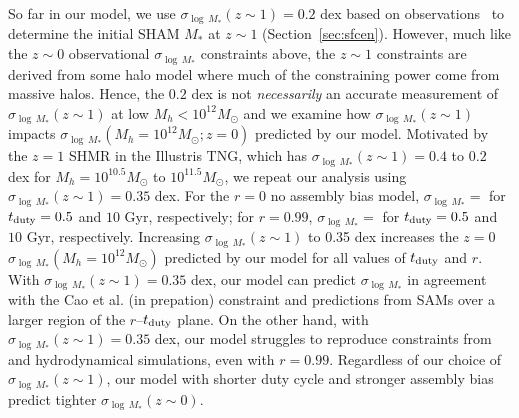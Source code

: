 \documentclass[12pt, letterpaper, preprint, tighten]{aastex62}
\begin{document}
So far in our model, we use $\sigma_{\log\,M_*}(z\sim1) = 0.2$ dex based on observations~\citep[\emph{e.g.}][]{leauthaud2012, tinker2013, patel2015}
to determine the initial SHAM $M_*$ at $z\sim1$ (Section~\ref{sec:sfcen}).
However, much like the $z\sim0$ observational $\sigma_{\log\,M_*}$ constraints 
above, the $z\sim1$ constraints are derived from some halo model where much of 
the constraining power come from massive halos. Hence, the $0.2$ dex is not 
{\em necessarily} an accurate measurement of $\sigma_{\log\,M_*}(z\sim1)$ at low 
$M_h < 10^{12}M_\odot$ and we examine how $\sigma_{\log\,M_*}(z\sim1)$ impacts 
$\sigma_{\log\,M_*}(M_h=10^{12}M_\odot; z=0)$ predicted by our model. Motivated by 
the $z=1$ SHMR in the Illustris TNG, which has $\sigma_{\log\,M_*}(z\sim1) = 0.4$ 
to $0.2$ dex for $M_h = 10^{10.5}M_\odot$ to $10^{11.5}M_\odot$, we repeat our 
analysis using $\sigma_{\log\,M_*}(z\sim1) = 0.35$ dex. For the $r=0$ no assembly bias model, 
$\sigma_{\log\,M_*} = $ for $t_{\rm duty} = 0.5$ and $10$ Gyr, respectively;
for $r = 0.99$, 
$\sigma_{\log\,M_*} = $ for $t_{\rm duty} = 0.5$ and $10$ Gyr, respectively.
Increasing $\sigma_{\log\,M_*}(z\sim1)$ to 0.35 dex increases the $z=0$ 
$\sigma_{\log\,M_*}(M_h=10^{12}M_\odot)$ predicted by our model for all values of 
$t_{\rm duty}$ and $r$. With $\sigma_{\log\,M_*}(z\sim1) = 0.35$ dex, our model 
can predict $\sigma_{\log\,M_*}$ in agreement with the Cao et al. (in prepation) 
constraint and predictions from SAMs over a larger region of the $r$--$t_{\rm duty}$ 
plane. On the other hand, with $\sigma_{\log\,M_*}(z\sim1) = 0.35$ dex, our model 
struggles to reproduce constraints from~\cite{more2011, leauthaud2012, reddick2013, tinker2013, zu2015} 
and hydrodynamical simulations, even with $r=0.99$. Regardless of our choice of 
$\sigma_{\log\,M_*}(z\sim1)$, our model with shorter duty cycle and stronger assembly bias predict tighter 
$\sigma_{\log\,M_*}(z\sim0)$. 
\end{document}
